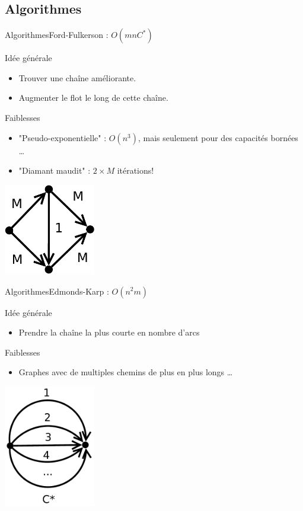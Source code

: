 \subsection{Algorithmes}
\begin{frame}{Algorithmes}{Ford-Fulkerson : $O(mnC^*)$}

\begin{block}{Idée générale}
\begin{itemize}
\item Trouver une chaîne améliorante.
\item Augmenter le flot le long de cette chaîne.
\end{itemize}
\end{block}

\begin{block}{Faiblesses}
\begin{itemize}
\item "Pseudo-exponentielle" : $O(n^3)$, mais seulement pour des capacités bornées \ldots
\item "Diamant maudit" : $2\times{M}$ itérations! 
\end{itemize}
\end{block}
\includegraphics[width=0.3\textwidth]{img/maudit}

\end{frame}
\begin{frame}{Algorithmes}{Edmonds-Karp : $O(n^2m)$}

\begin{block}{Idée générale}
\begin{itemize}
\item Prendre la chaîne la plus courte en nombre d'arcs
\end{itemize}
\end{block}

\begin{block}{Faiblesses}
\begin{itemize}
\item Graphes avec de multiples chemins de plus en plus longs \dots
\end{itemize}
\end{block}
\includegraphics[width=0.3\textwidth]{img/anti_ek}

\end{frame}

